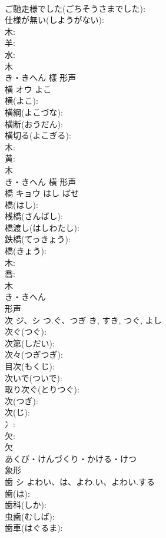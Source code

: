 \documentclass[8pt]{extreport}
\begin{document}
\begin{CJK}{UTF8}{min}
\\	ご馳走様でした(ごちそうさまでした): 
\\	仕様が無い(しようがない): 
\\	木: 
\\	羊: 
\\	水: 
\\	木	
\\	き・きへん	樣	形声 
\\	横	オウ	よこ		
\\	横(よこ): 
\\	横綱(よこづな): 
\\	横断(おうだん): 
\\	横切る(よこぎる): 
\\	木: 
\\	黄: 
\\	木	
\\	き・きへん	橫	形声 
\\	橋	キョウ	はし	ばせ	
\\	橋(はし): 
\\	桟橋(さんばし): 
\\	橋渡し(はしわたし): 
\\	鉄橋(てっきょう): 
\\	橋(きょう): 
\\	木: 
\\	喬: 
\\	木	
\\	き・きへん	
\\	形声 
\\	次	ジ、シ	つ.ぐ、つぎ	き, すき, つぐ, よし	
\\	次ぐ(つぐ): 
\\	次第(しだい): 
\\	次々(つぎつぎ): 
\\	目次(もくじ): 
\\	次いで(ついで): 
\\	取り次ぐ(とりつぐ): 
\\	次(つぎ): 
\\	次(じ): 
\\	冫: 
\\	欠: 
\\	欠	
\\	あくび・けんづくり・かける・けつ	
\\	象形 
\\	歯	シ	よわい、は、よわ.い、よわい.する		
\\	歯(は): 
\\	歯科(しか): 
\\	虫歯(むしば): 
\\	歯車(はぐるま): 

\end{CJK}
\end{document}
